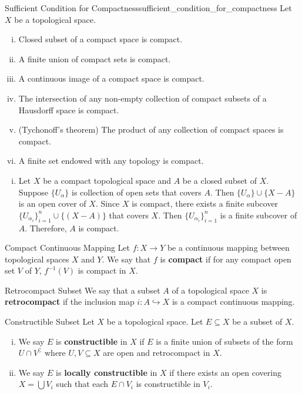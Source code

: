 \documentclass{report}
\begin{document}
\begin{proposition}{Sufficient Condition for Compactness}{sufficient_condition_for_compactness}
	Let $X$ be a topological space.
	\begin{enumerate}[(i)]
		\item Closed subset of a compact space is compact.
		\item A finite union of compact sets is compact.
		\item A continuous image of a compact space is compact.
		\item The intersection of any non-empty collection of compact subsets of a Hausdorff space is compact.
		\item (Tychonoff's theorem) The product of any collection of compact spaces is compact.
		\item A finite set endowed with any topology is compact.
	\end{enumerate}
\end{proposition}
\begin{prf}
	\begin{enumerate}[(i)]
	\item Let $X$ be a compact topological space and $A$ be a closed subset of $X$. Suppose $\{U_\alpha\}$ is collection of open sets that covers $A$. Then $\{U_\alpha\}\cup\{X-A\}$ is an open cover of $X$. Since $X$ is compact, there exists a finite subcover $\{U_{\alpha_i}\}_{i=1}^n \cup\{(X-A)\}$ that covers $X$. Then $\{U_{\alpha_i}\}_{i=1}^n$ is a finite subcover of $A$. Therefore, $A$ is compact.
	\end{enumerate}
\end{prf}

\begin{definition}{Compact Continuous Mapping}{}
	Let $f:X\to Y$ be a continuous mapping between topological spaces $X$ and $Y$. We say that $f$ is \textbf{compact} if for any compact open set $V$ of $Y$, $f^{-1}(V)$ is compact in $X$.
\end{definition}

\begin{definition}{Retrocompact Subset}{}
	We say that a subset $A$ of a topological space $X$ is \textbf{retrocompact} if the inclusion map $i:A\hookrightarrow X$ is a compact continuous mapping.
\end{definition}

\begin{definition}{Constructible Subset}{}
	Let $X$ be a topological space. Let $E \subseteq X$ be a subset of $X$.
	\begin{enumerate}[(i)]
		\item We say $E$ is \textbf{constructible} in $X$ if $E$ is a finite union of subsets of the form $U \cap V^{\complement}$ where $U, V \subseteq X$ are open and retrocompact in $X$.
		\item We say $E$ is \textbf{locally constructible} in $X$ if there exists an open covering $X=\bigcup V_i$ such that each $E \cap V_i$ is constructible in $V_i$.
	\end{enumerate}
\end{definition}
\end{document}
